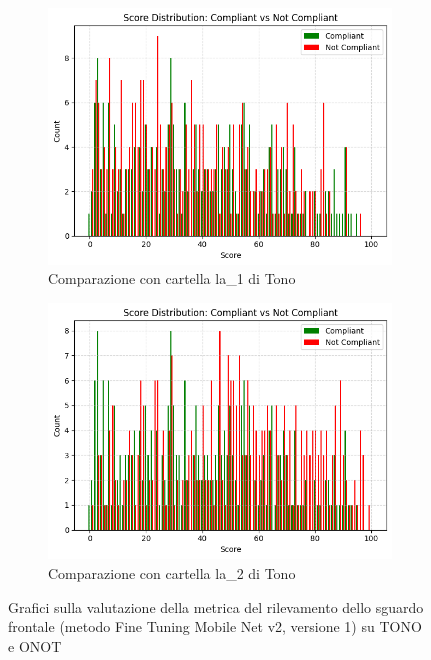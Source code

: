 \documentclass[12pt,a4paper,openright,twoside]{book}
\begin{document}
\begin{figure}[htbp]
    \centering
    \begin{subfigure}{0.49\textwidth}
        \centering
        \includegraphics[width=.7\linewidth]{figures/score-distribution-frontal-gaze-gdd-v1-la1.png}
        \caption{Comparazione con cartella la\_1 di Tono}
        \label{fig:score_distribution_frontal_gaze_gdd_v1_la1}
    \end{subfigure}
    \hfill
    \begin{subfigure}{0.49\textwidth}
        \centering
        \includegraphics[width=.7\linewidth]{figures/score-distribution-frontal-gaze-gdd-v1-la2.png}
        \caption{Comparazione con cartella la\_2 di Tono}
        \label{fig:score_distribution_frontal_gaze_gdd_v1_la2}
    \end{subfigure}

    \caption{Grafici sulla valutazione della metrica del rilevamento dello sguardo frontale (metodo Fine Tuning Mobile Net v2, versione 1) su TONO e ONOT}
\end{figure}
\end{document}
